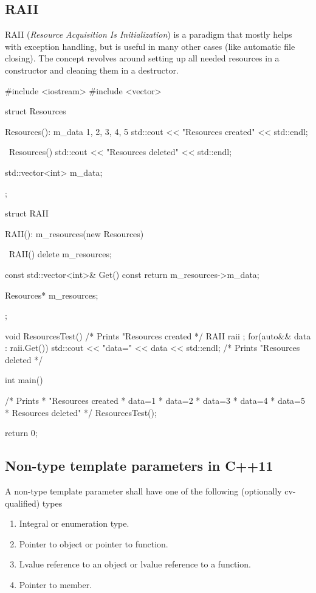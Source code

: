 \documentclass[../main]{subfiles}
\begin{document}
\subsection{RAII}
    RAII (\textit{Resource Acquisition Is Initialization}) is a paradigm that mostly helps with exception handling, but is useful in many other cases (like automatic file closing).
The concept revolves around setting up all needed resources in a constructor and cleaning them in a destructor.
\begin{Code}
    #include <iostream>
    #include <vector>
    
    struct Resources
    {
        Resources(): m_data { 1, 2, 3, 4, 5 }
        {
            std::cout << "Resources created" << std::endl;
        }
        
        ~Resources()
        {
            std::cout << "Resources deleted" << std::endl;
        }
        
        std::vector<int> m_data;
    };
    
    struct RAII
    {
        RAII(): m_resources(new Resources)
        {
        }
        
        ~RAII()
        {
            delete m_resources;
        }
        
        const std::vector<int>& Get() const
        {
            return m_resources->m_data;
        }
        
        Resources* m_resources;
    };
    
    void ResourcesTest()
    {
        /* Prints "Resources created */
        RAII raii {};
        for(auto&& data : raii.Get())
        {
            std::cout << "data=" << data << std::endl;
        }
        /* Prints "Resources deleted */
    }
    
    int main()
    {
        /* Prints
         * "Resources created
         * data=1
         * data=2
         * data=3
         * data=4
         * data=5
         * Resources deleted"
        */
        ResourcesTest();
        
        return 0;
    }
\end{Code}

\subsection{Non-type template parameters in C++11}
    A non-type template parameter shall have one of the following (optionally cv-qualified) types
\begin{enumerate}
    \item Integral or enumeration type.
    \item Pointer to object or pointer to function.
    \item Lvalue reference to an object or lvalue reference to a function.
    \item Pointer to member.
\end{enumerate}
\end{document}
